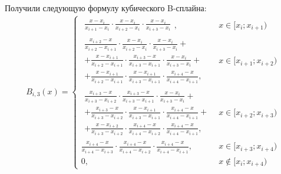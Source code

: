 \documentclass[a4paper,14pt]{extarticle}
\begin{document}
    Получили следующую формулу кубического B-сплайна:
    \begin{equation} \label{B_spline}
        \begin{gathered} \displaystyle
            B_{i, 3}(x) = \begin{cases}
                \begin{array}{l}
                    \displaystyle \frac{x - x_i}{x_{i + 1} - x_i} \cdot \frac{x - x_i}{x_{i + 2} - x_i} \cdot \frac{x - x_i}{x_{i + 3} - x_i}
                \end{array}, & x \in [x_i; x_{i + 1}) \\
                \begin{array}{l}
                    \displaystyle \frac{x_{i + 2} - x}{x_{i + 2} - x_{i + 1}} \cdot \frac{x - x_i}{x_{i + 2} - x_i} \cdot \frac{x - x_i}{x_{i + 3} - x_i} + \\
                    \displaystyle + \frac{x - x_{i + 1}}{x_{i + 2} - x_{i + 1}} \cdot \frac{x_{i + 3} - x}{x_{i + 3} - x_{i + 1}} \cdot \frac{x - x_i}{x_{i + 3} - x_i} + \\
                    \displaystyle + \frac{x - x_{i + 1}}{x_{i + 2} - x_{i + 1}} \cdot \frac{x - x_{i + 1}}{x_{i + 3} - x_{i + 1}} \cdot \frac{x_{i + 4} - x}{x_{i + 4} - x_{i + 1}},
                \end{array} & x \in [x_{i + 1}; x_{i + 2}) \\
                \begin{array}{l}
                    \displaystyle \frac{x_{i + 3} - x}{x_{i + 3} - x_{i + 2}} \cdot \frac{x_{i + 3} - x}{x_{i + 3} - x_{i + 1}} \cdot \frac{x - x_i}{x_{i + 3} - x_i} + \\
                    \displaystyle + \frac{x_{i + 3} - x}{x_{i + 3} - x_{i + 2}} \cdot \frac{x - x_{i + 1}}{x_{i + 3} - x_{i + 1}} \cdot \frac{x_{i + 4} - x}{x_{i + 4} - x_{i + 1}} + \\
                    \displaystyle + \frac{x - x_{i + 2}}{x_{i + 3} - x_{i + 2}} \cdot \frac{x_{i + 4} - x}{x_{i + 4} - x_{i + 2}} \cdot \frac{x_{i + 4} - x}{x_{i + 4} - x_{i + 1}},
                \end{array} & x \in [x_{i + 2}; x_{i + 3}) \\
                \displaystyle \frac{x_{i + 4} - x}{x_{i + 4} - x_{i + 3}} \cdot \frac{x_{i + 4} - x}{x_{i + 4} - x_{i + 2}} \cdot \frac{x_{i + 4} - x}{x_{i + 4} - x_{i + 1}}, & x \in [x_{i + 3}; x_{i + 4}) \\
                0, & x \notin [x_i; x_{i + 4})
            \end{cases}
        \end{gathered}
    \end{equation}
\end{document}
